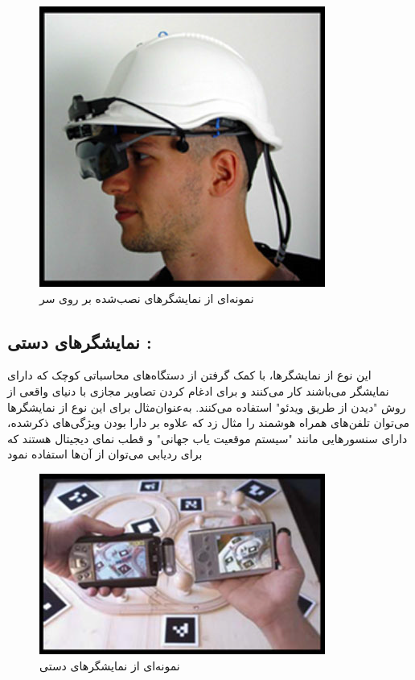 \begin{figure}[tb]
	\centering
	\includegraphics[width=0.6\linewidth]{image/hmd}
	\caption {نمونه‌ای از نمایشگرهای نصب‌شده بر روی سر\cite{Julie}}
	\label{fig:hmd}
\end{figure}

\subsection{نمایشگرهای دستی\protect{} :}
این نوع از نمایشگرها، با کمک گرفتن از دستگاه‌های محاسباتی کوچک که دارای نمایشگر می‌باشند کار می‌کنند و برای ادغام کردن تصاویر مجازی با دنیای واقعی از روش "دیدن از طریق ویدئو" استفاده می‌کنند. به‌عنوان‌مثال برای این نوع از نمایشگرها می‌توان تلفن‌های  همراه هوشمند را مثال زد که علاوه بر دارا بودن ویژگی‌های ذکرشده، دارای سنسورهایی مانند "سیستم موقعیت یاب جهانی" و قطب نمای دیجیتال هستند که برای ردیابی می‌توان از آن‌ها استفاده نمود
\begin{figure}[tb]
	\centering
	\includegraphics[width=0.7\linewidth]{image/mobile}
	\caption {نمونه‌ای از نمایشگرهای دستی\cite{Julie}}
	\label{fig:mobile}
\end{figure}
